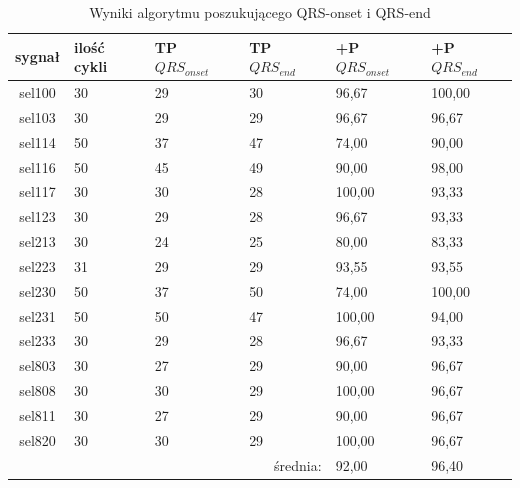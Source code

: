 \begin{table}[h!]
\caption{Wyniki algorytmu poszukującego QRS-onset i QRS-end}
\label{tab:Waves_tabela1}
\begin{tabularx}{\textwidth}{|c|X|X|X|X|X|}
  \hline
sygnał &
ilość cykli  &
TP $QRS_{onset}$ &
TP \hspace{2mm}  $   QRS_{end}$ &
+P $QRS_{onset}$  &
+P \hspace{2mm} $  QRS_{end}$  \\
\hline
sel100 & 30 & 29 & 30 & 96,67 & 100,00 \\
sel103 &
30  &
29  &
29  &
96,67 &
96,67 \\
sel114 &
50 &
37 &
47 &
74,00 &
90,00 \\
sel116 &
50 &
45 &
49 &
90,00 &
98,00 \\
sel117 &
30 &
30 &
28 &
100,00 &
93,33 \\
sel123 &
30 &
29 &
28 &
96,67 &
93,33 \\
sel213 &
30 &
24 &
25 &
80,00 &
83,33 \\
sel223 &
31 &
29 &
29 &
 93,55 &
93,55 \\
sel230 &
50 &
37 &
50 &
74,00 &
100,00 \\
sel231 &
50 &
50 &
47 &
100,00 &
94,00 \\
sel233 &
30 &
29 &
28 &
96,67 &
93,33 \\
sel803 &
30 &
27 &
29 &
90,00 &
96,67 \\
sel808 &
30 &
30 &
29 &
100,00 &
96,67 \\
sel811 &
30 &
27 &
29 &
90,00 &
96,67 \\
sel820 &
30 &
30 &
29 &
100,00 &
96,67 \\
\hline \hline
\multicolumn{4}{|r|}{średnia:}   &
 92,00 &
96,40 \\
\hline

\end{tabularx}
\end{table}

